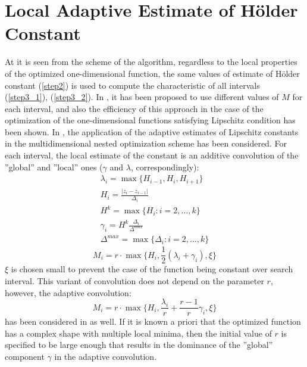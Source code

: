 \documentclass[procedia]{easychair}
\begin{document}
\section{Local Adaptive Estimate of Hölder Constant}
At it is seen from the scheme of the algorithm, regardless to the local properties
of the optimized one-dimensional function, the same values of estimate of Hölder
constant (\ref{step2}) is used to compute the characteristic of all intervals (\ref{step3_1}), (\ref{step3_2}).
In \cite{sergLocalTuning}, it has been proposed to use different values of \(M\) for each interval,
and also the efficiency of this approach in the case of the optimization of the
one-dimensional functions satisfying Lipschitz condition has been shown. In \cite{nestedLocal},
the application of the adaptive estimates of Lipschitz constants in the multidimensional
nested optimization scheme has been considered. For each interval, the local estimate of the
constant is an additive convolution of the ''global'' and ''local'' ones (\(\gamma\) and \(\lambda\), correspondingly):
\begin{displaymath}
  \begin{array}{lr}
    \lambda_i=\max\{H_{i-1},H_i,H_{i+1}\} \\
    H_i=\frac{|z_i-z_{i-1}|}{\Delta_i} \\
    H^k=\max\{H_i:i=2,\dots ,k\} \\
    \gamma_i=H^k\frac{\Delta_i}{\Delta^{max}} \\
    \Delta^{max}=\max\{\Delta_{i}:i=2,\dots ,k\}
  \end{array}
\end{displaymath}
\begin{equation}
\label{additiveConv}
M_i=r\cdot \max\{H_i, \frac{1}{2}(\lambda_i+\gamma_i),\xi\}
\end{equation}
\(\xi\) is chosen small to prevent the case of the function being constant over search interval.
This variant of convolution does not depend on the parameter \(r\), however, the adaptive convolution:
\begin{equation}
\label{additiveAdaptiveConv}
M_i=r\cdot \max\{H_i, \frac{\lambda_i}{r}+\frac{r-1}{r}\gamma_i,\xi\}
\end{equation}
has been considered in \cite{sergLocalTuning} as well.
If it is known a priori that the optimized function has a complex shape with multiple
local minima, then the initial value of \(r\) is specified to be large enough that
results in the dominance of the ''global'' component \(\gamma\) in the adaptive convolution.
\end{document}
